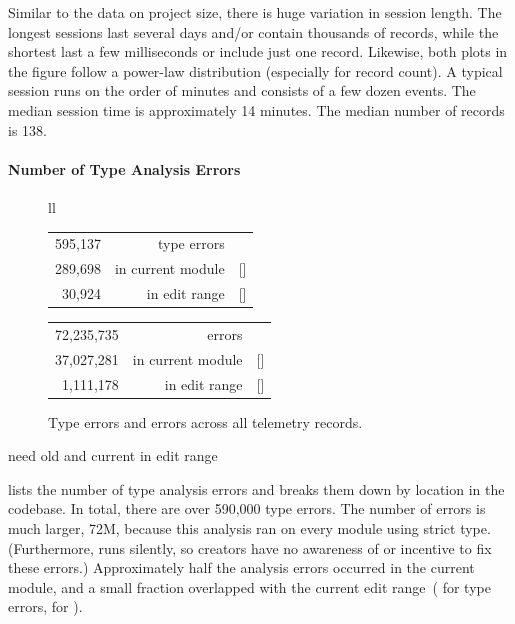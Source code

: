 \documentclass[english,submission,cleveref]{programming}
\begin{document}
Similar to the data on project size, there is huge variation in session
length.
The longest sessions last several days and/or contain thousands of records,
while the shortest last a few milliseconds or include just one record.
Likewise, both plots in the figure follow a power-law distribution
(especially for record count).
A typical session runs on the order of minutes and consists of a few dozen events.
The median session time is approximately 14 minutes.
The median number of
records is 138.


\paragraph{Number of Type Analysis Errors}

\begin{figure}[t]
  \begin{tabular}[t]{ll} \\
    \begin{tabular}[t]{r@{~~}r@{~}l}
      595,137 & type errors \\
      289,698 & in current module & [\pct{48.68}] \\
       30,924 & in edit range & [\pct{5.20}]
    \end{tabular}
    \begin{tabular}[t]{r@{~~}r@{~}l}
      72,235,735 & {\FS{} errors} \\
      37,027,281 & in current module & [\pct{51.26}] \\
       1,111,178 & in edit range & [\pct{1.54}]
    \end{tabular}
  \end{tabular}
  \caption{Type errors and \FS{} errors across all telemetry records.}
  \label{f:count-analysis-errors}
\end{figure}

\FILL{} need old and current in edit range

 lists the number of type analysis errors
and breaks them down by location in the codebase.
In total, there are over 590,000 type errors.
The number of \FS{} errors is much larger, 72M, because this analysis
ran on every module using strict type.
(Furthermore, \FS{} runs silently, so creators have no
awareness of or incentive to
fix these errors.)
Approximately half the analysis errors occurred in the current module,
and a small fraction overlapped with the current edit range~( for
type errors,  for \FS{}).
\end{document}
